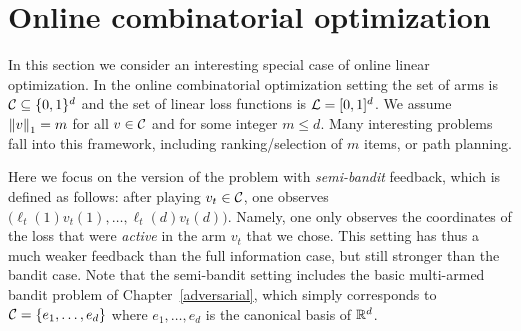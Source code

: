 \section{Online combinatorial optimization} \label{sec:semibandit}
In this section we consider an interesting special case of online linear optimization. In the online combinatorial optimization setting the set of arms is $\mathcal{C} \subseteq \{0,1\}^d$ and the set of linear loss functions is $\mathcal{L} = [0,1]^d$. We assume $\left\|{v}\right\|_1 = m$ for all $v\in\mathcal{C}$ and for some integer $m \le d$. Many interesting problems fall into this framework, including ranking/selection of $m$ items, or path planning.

Here we focus on the version of the problem with {\em semi-bandit} feedback, which is defined as follows: after playing $v_t \in \mathcal{C}$, one observes $\bigl(\ell_t(1) v_t(1), \hdots, \ell_t(d) v_t(d)\bigr)$. Namely, one only observes the coordinates of the loss that were {\em active} in the arm $v_t$ that we chose. This setting has thus a much weaker feedback than the full information case, but still stronger than the bandit case. Note that the semi-bandit setting includes the basic multi-armed bandit problem of Chapter~\ref{adversarial}, which simply corresponds to $\mathcal{C} = \{e_1, \hdots, e_d\}$ where $e_1, \hdots, e_d$ is the canonical basis of $\mathbb{R}^d$.

